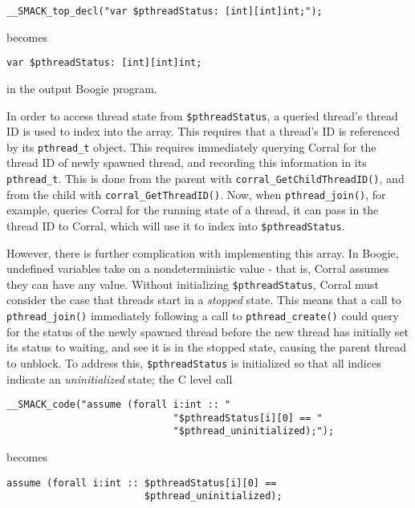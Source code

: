 \begin{lstlisting}[frame=none,xleftmargin=2\parindent]
__SMACK_top_decl("var $pthreadStatus: [int][int]int;");
\end{lstlisting}

\noindent becomes

\begin{lstlisting}[frame=none,xleftmargin=2\parindent,language=boogie]
var $pthreadStatus: [int][int]int;
\end{lstlisting}

\noindent in the output Boogie program.

In order to access thread state from \lstinline|$pthreadStatus|, a
queried thread's thread ID is used to index into the array.  This
requires that a thread's ID is referenced by its
\lstinline|pthread_t| object.  This requires immediately querying
Corral for the thread ID of newly spawned thread, and recording this
information in its \lstinline|pthread_t|.  This is done from the
parent with \lstinline|corral_GetChildThreadID()|, and from the child
with \lstinline|corral_GetThreadID()|.  Now, when
\lstinline|pthread_join()|, for example, queries Corral for the
running state of a thread, it can pass in the thread ID to Corral,
which will use it to index into \lstinline|$pthreadStatus|.

However, there is further complication with implementing this
array. In Boogie, undefined variables take on a nondeterministic value
- that is, Corral assumes they can have any value.  Without
initializing \lstinline|$pthreadStatus|, Corral must consider the case
that threads start in a \emph{stopped} state.  This means that a call
to \lstinline|pthread_join()| immediately following a call to
\lstinline|pthread_create()| could query for the status of the newly
spawned thread before the new thread has initially set its status to
waiting, and see it is in the stopped state, causing the parent thread
to unblock.  To address this, \lstinline|$pthreadStatus| is
initialized so that all indices indicate an \emph{uninitialized}
state; the C level call 

\begin{lstlisting}[frame=none,xleftmargin=2\parindent]
__SMACK_code("assume (forall i:int :: "
                             "$pthreadStatus[i][0] == "
                             "$pthread_uninitialized);"); 
\end{lstlisting}

\noindent becomes 

\begin{lstlisting}[frame=none,xleftmargin=2\parindent,language=boogie]
assume (forall i:int :: $pthreadStatus[i][0] == 
                        $pthread_uninitialized);
\end{lstlisting}

